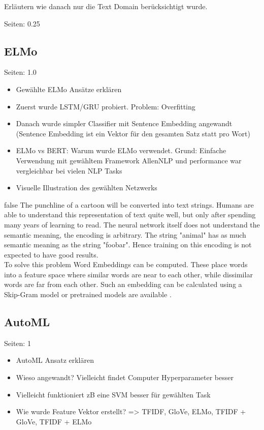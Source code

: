 \documentclass[draft,final,oneside]{vutinfth} %
\begin{document}
Erläutern wie danach nur die Text Domain berücksichtigt wurde.

Seiten: 0.25

\subsection{ELMo}

Seiten: 1.0

\begin{itemize}
\item Gewählte ELMo Ansätze erklären
\item Zuerst wurde LSTM/GRU probiert. Problem: Overfitting
\item Danach wurde simpler Classifier mit Sentence Embedding angewandt (Sentence Embedding ist ein Vektor für den gesamten Satz statt pro Wort)
\item ELMo vs BERT: Warum wurde ELMo verwendet. Grund: Einfache Verwendung mit gewähltem Framework AllenNLP und performance war vergleichbar bei vielen NLP Tasks
\item Visuelle Illustration des gewählten Netzwerks
\end{itemize}

\if false
The punchline of a cartoon will be converted into text strings. Humans are able to understand this representation of text quite well, but only after spending many years of learning to read. The neural network itself does not understand the semantic meaning, the encoding is arbitrary. The string "animal" has as much semantic meaning as the string "foobar". Hence training on this encoding is not expected to have good results. \\

To solve this problem Word Embeddings can be computed. These place words into a feature space where similar words are near to each other, while dissimilar words are far from each other. Such an embedding can be calculated using a Skip-Gram model \cite{wordembedding} or pretrained models are available \cite{pennington2014glove}.
\fi

\subsection{AutoML}

Seiten: 1

\begin{itemize}
\item AutoML Ansatz erklären
\item Wieso angewandt? Vielleicht findet Computer Hyperparameter besser
\item Vielleicht funktioniert zB eine SVM besser für gewählten Task
\item Wie wurde Feature Vektor erstellt? => TFIDF, GloVe, ELMo, TFIDF + GloVe, TFIDF + ELMo
\end{itemize}
\end{document}
